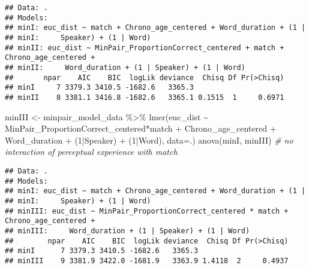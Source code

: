 \documentclass[
]{article}
\newenvironment{Shaded}{\begin{snugshade}}{\end{snugshade}}
\newcommand{\AttributeTok}[1]{\textcolor[rgb]{0.77,0.63,0.00}{#1}}
\newcommand{\CommentTok}[1]{\textcolor[rgb]{0.56,0.35,0.01}{\textit{#1}}}
\newcommand{\DecValTok}[1]{\textcolor[rgb]{0.00,0.00,0.81}{#1}}
\newcommand{\FunctionTok}[1]{\textcolor[rgb]{0.00,0.00,0.00}{#1}}
\newcommand{\NormalTok}[1]{#1}
\newcommand{\OtherTok}[1]{\textcolor[rgb]{0.56,0.35,0.01}{#1}}
\newcommand{\SpecialCharTok}[1]{\textcolor[rgb]{0.00,0.00,0.00}{#1}}
\begin{document}
\begin{verbatim}
## Data: .
## Models:
## minI: euc_dist ~ match + Chrono_age_centered + Word_duration + (1 | 
## minI:     Speaker) + (1 | Word)
## minII: euc_dist ~ MinPair_ProportionCorrect_centered + match + Chrono_age_centered + 
## minII:     Word_duration + (1 | Speaker) + (1 | Word)
##       npar    AIC    BIC  logLik deviance  Chisq Df Pr(>Chisq)
## minI     7 3379.3 3410.5 -1682.6   3365.3                     
## minII    8 3381.1 3416.8 -1682.6   3365.1 0.1515  1     0.6971
\end{verbatim}

\begin{Shaded}
\begin{Highlighting}[]
\NormalTok{minIII }\OtherTok{\textless{}{-}}\NormalTok{ minpair\_model\_data }\SpecialCharTok{\%\textgreater{}\%}
  \FunctionTok{lmer}\NormalTok{(euc\_dist }\SpecialCharTok{\textasciitilde{}}\NormalTok{ MinPair\_ProportionCorrect\_centered}\SpecialCharTok{*}\NormalTok{match }\SpecialCharTok{+} 
\NormalTok{         Chrono\_age\_centered }\SpecialCharTok{+} 
\NormalTok{         Word\_duration }\SpecialCharTok{+} 
\NormalTok{         (}\DecValTok{1}\SpecialCharTok{|}\NormalTok{Speaker) }\SpecialCharTok{+} 
\NormalTok{         (}\DecValTok{1}\SpecialCharTok{|}\NormalTok{Word), }
       \AttributeTok{data=}\NormalTok{.) }
\FunctionTok{anova}\NormalTok{(minI, minIII)  }\CommentTok{\#  no interaction of perceptual experience with match}
\end{Highlighting}
\end{Shaded}

\begin{verbatim}
## Data: .
## Models:
## minI: euc_dist ~ match + Chrono_age_centered + Word_duration + (1 | 
## minI:     Speaker) + (1 | Word)
## minIII: euc_dist ~ MinPair_ProportionCorrect_centered * match + Chrono_age_centered + 
## minIII:     Word_duration + (1 | Speaker) + (1 | Word)
##        npar    AIC    BIC  logLik deviance  Chisq Df Pr(>Chisq)
## minI      7 3379.3 3410.5 -1682.6   3365.3                     
## minIII    9 3381.9 3422.0 -1681.9   3363.9 1.4118  2     0.4937
\end{verbatim}
\end{document}
